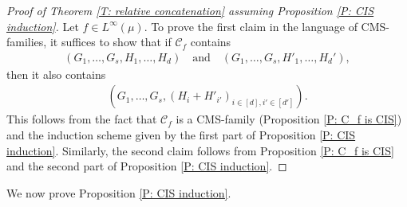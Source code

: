 \documentclass[11pt]{amsart}
\theoremstyle{definition}
\newcommand{\CC}{{\mathcal C}}
\newcommand{\1}{{\mathbf{1}}}
\begin{document}
\begin{proof}[Proof of Theorem \ref{T: relative concatenation} assuming Proposition \ref{P: CIS induction}]
    Let $f\in L^\infty(\mu)$. To prove the first claim in the language of CMS-families, it suffices to show that if $\CC_f$ contains 
    \begin{align*}
        (G_{1},\dots,G_s,H_{1},\dots,H_{d})\quad \textrm{and}\quad (G_{1},\dots,G_s,H'_{1},\dots,H_{d}'),
    \end{align*}
    then it also contains 
    \begin{align*}
        (G_{1},\dots,G_{s},(H_{i}+H'_{i'})_{i\in[d], i'\in[d']}).
    \end{align*}
    This follows from the fact that $\CC_f$ is a CMS-family (Proposition \ref{P: C_f is CIS}) and the induction scheme given by the first part of Proposition \ref{P: CIS induction}. Similarly, the second claim follows from Proposition \ref{P: C_f is CIS} and the second part of Proposition \ref{P: CIS induction}.
\end{proof}

We now prove Proposition \ref{P: CIS induction}.
\end{document}
